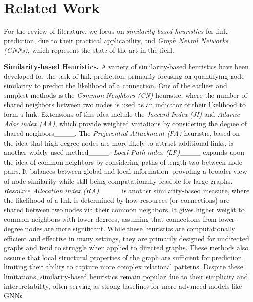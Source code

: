 \section{Related Work}
\label{sec:literature}
For the review of literature, we focus on \emph{similarity-based heuristics} for link prediction, due to their practical applicability, and \emph{Graph Neural Networks (GNNs)}, which represent the state-of-the-art in the field. 

\textbf{Similarity-based Heuristics.} A variety of similarity-based heuristics have been developed for the task of link prediction, primarily focusing on quantifying node similarity to predict the likelihood of a connection. One of the earliest and simplest methods is the \emph{Common Neighbors (CN)} heuristic, where the number of shared neighbors between two nodes is used as an indicator of their likelihood to form a link. Extensions of this idea include the \emph{Jaccard Index (JI)} and \emph{Adamic-Adar index (AA)}, which provide weighted variations by considering the degree of shared neighbors____. The \emph{Preferential Attachment (PA)} heuristic, based on the idea that high-degree nodes are more likely to attract additional links, is another widely used method____. \emph{Local Path index (LP)}____ expands upon the idea of common neighbors by considering paths of length two between node pairs. It balances between global and local information, providing a broader view of node similarity while still being computationally feasible for large graphs. \emph{Resource Allocation index (RA)}____ is another similarity-based measure, where the likelihood of a link is determined by how resources (or connections) are shared between two nodes via their common neighbors. It gives higher weight to common neighbors with lower degrees, assuming that connections from lower-degree nodes are more significant. While these heuristics are computationally efficient and effective in many settings, they are primarily designed for undirected graphs and tend to struggle when applied to directed graphs. These methods also assume that local structural properties of the graph are sufficient for prediction, limiting their ability to capture more complex relational patterns. Despite these limitations, similarity-based heuristics remain popular due to their simplicity and interpretability, often serving as strong baselines for more advanced models like GNNs. 

